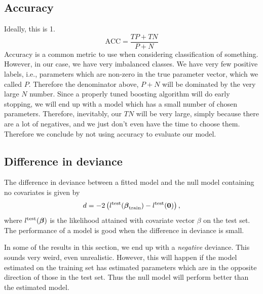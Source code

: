 \subsection{Accuracy}
Ideally, this is 1.
\begin{equation}\label{eq:accuracy}
    \text{ACC}=\frac{TP+TN}{P+N}
\end{equation}
Accuracy is a common metric to use when considering classification of something. However, in our case, we have very imbalanced classes. We have very few positive labels, i.e., parameters which are non-zero in the true parameter vector, which we called $P$. Therefore the denominator above, $P+N$ will be dominated by the very large $N$ number. Since a properly tuned boosting algorithm will do early stopping, we will end up with a model which has a small number of chosen parameters. Therefore, inevitably, our $TN$ will be very large, simply because there are a lot of negatives, and we just don't even have the time to choose them. Therefore we conclude by not using accuracy to evaluate our model.

\subsection{Difference in deviance}
The difference in deviance between a fitted model and the null model containing no covariates is given by
\begin{equation*}
    d=-2\left(l^{\text{test}}(\boldsymbol{\beta}_{\text{train}})-l^{\text{test}}(\mathbf{0})\right),
\end{equation*}
where $l^{\text{test}}(\boldsymbol{\beta})$ is the likelihood attained with covariate vector $\beta$ on the test set.
The performance of a model is good when the difference in deviance is small.

In some of the results in this section, we end up with a \textit{negative} deviance. This sounds very weird, even unrealistic. However, this will happen if the model estimated on the training set has estimated parameters which are in the opposite direction of those in the test set. Thus the null model will perform better than the estimated model.


